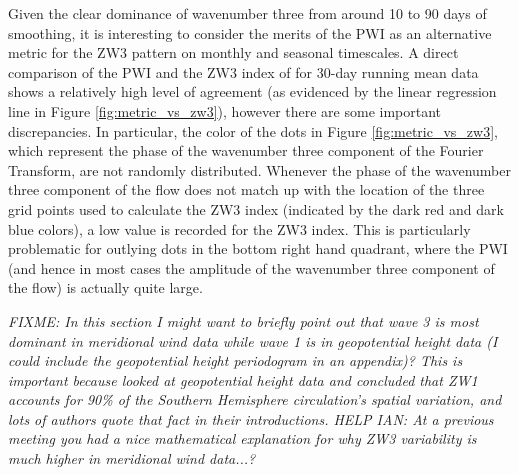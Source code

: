 Given the clear dominance of wavenumber three from around 10 to 90 days of smoothing, it is interesting to consider the merits of the PWI as an alternative metric for the ZW3 pattern on monthly and seasonal timescales. A direct comparison of the PWI and the ZW3 index of \citet{Raphael2004} for 30-day running mean data shows a relatively high level of agreement (as evidenced by the linear regression line in Figure \ref{fig:metric_vs_zw3}), however there are some important discrepancies. In particular, the color of the dots in Figure \ref{fig:metric_vs_zw3}, which represent the phase of the wavenumber three component of the Fourier Transform, are not randomly distributed. Whenever the phase of the wavenumber three component of the flow does not match up with the location of the three grid points used to calculate the ZW3 index (indicated by the dark red and dark blue colors), a low value is recorded for the ZW3 index. This is particularly problematic for outlying dots in the bottom right hand quadrant, where the PWI (and hence in most cases the amplitude of the wavenumber three component of the flow) is actually quite large.      

\textit{FIXME: In this section I might want to briefly point out that wave 3 is most dominant in meridional wind data while wave 1 is in geopotential height data (I could include the geopotential height periodogram in an appendix)? This is important because \citet{vanLoon1972} looked at geopotential height data and concluded that ZW1 accounts for 90\% of the Southern Hemisphere circulation's spatial variation, and lots of authors quote that fact in their introductions. HELP IAN: At a previous meeting you had a nice mathematical explanation for why ZW3 variability is much higher in meridional wind data...? }

